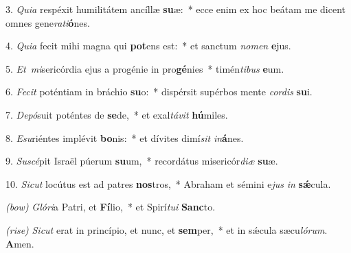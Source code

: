 3. \textit{Quia} respéxit humilitátem ancíllæ \textbf{su}æ:~*
	ecce enim ex hoc beátam me dicent omnes gene\textit{ra}\textit{ti}\textbf{ó}nes.

4. \textit{Quia} fecit mihi magna qui \textbf{pot}ens est:~* 
	et sanctum \textit{no}\textit{men} \textbf{e}jus.

5. \textit{Et\ mi}sericórdia ejus a progénie in pro\textbf{gé}nies~*
	timén\textit{ti}\textit{bus} \textbf{e}um.

6. \textit{Fecit} poténtiam in bráchio \textbf{su}o:~*
	dispérsit supérbos mente \textit{cor}\textit{dis} \textbf{su}i.

7. \textit{Depó}suit poténtes de \textbf{se}de,~*
	et exal\textit{tá}\textit{vit} \textbf{hú}miles.

8. \textit{Esu}riéntes implévit \textbf{bo}nis:~*
	et dívites dimí\textit{sit} \textit{in}\textbf{á}nes.

9. \textit{Suscé}pit Israël púerum \textbf{su}um,~*
	recordátus misericór\textit{di}\textit{æ} \textbf{su}æ.

10. \textit{Sicut} locútus est ad patres \textbf{nos}tros,~*
	Abraham et sémini e\textit{jus} \textit{in} \textbf{s\'{\ae}}cula.

\textit{(bow)} \textit{Glóri}a Patri, et \textbf{Fí}lio,~* 
	et Spirí\textit{tu}\textit{i} \textbf{Sanc}to.

\textit{(rise)} \textit{Sicut} erat in princípio, et nunc, et \textbf{sem}per,~*
	et in s\'{\ae}cula sæcu\textit{ló}\textit{rum}. \textbf{A}men.